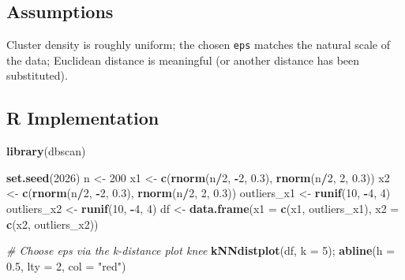 \documentclass[
]{article}
\newenvironment{Shaded}{\begin{snugshade}}{\end{snugshade}}
\newcommand{\AttributeTok}[1]{\textcolor[rgb]{0.13,0.29,0.53}{#1}}
\newcommand{\CommentTok}[1]{\textcolor[rgb]{0.56,0.35,0.01}{\textit{#1}}}
\newcommand{\DecValTok}[1]{\textcolor[rgb]{0.00,0.00,0.81}{#1}}
\newcommand{\FloatTok}[1]{\textcolor[rgb]{0.00,0.00,0.81}{#1}}
\newcommand{\FunctionTok}[1]{\textcolor[rgb]{0.13,0.29,0.53}{\textbf{#1}}}
\newcommand{\NormalTok}[1]{#1}
\newcommand{\OtherTok}[1]{\textcolor[rgb]{0.56,0.35,0.01}{#1}}
\newcommand{\SpecialCharTok}[1]{\textcolor[rgb]{0.81,0.36,0.00}{\textbf{#1}}}
\newcommand{\StringTok}[1]{\textcolor[rgb]{0.31,0.60,0.02}{#1}}
\begin{document}
\subsection{Assumptions}\label{assumptions}

Cluster density is roughly uniform; the chosen \texttt{eps} matches the
natural scale of the data; Euclidean distance is meaningful (or another
distance has been substituted).

\subsection{R Implementation}\label{r-implementation}

\begin{Shaded}
\begin{Highlighting}[]
\FunctionTok{library}\NormalTok{(dbscan)}

\FunctionTok{set.seed}\NormalTok{(}\DecValTok{2026}\NormalTok{)}
\NormalTok{n }\OtherTok{\textless{}{-}} \DecValTok{200}
\NormalTok{x1 }\OtherTok{\textless{}{-}} \FunctionTok{c}\NormalTok{(}\FunctionTok{rnorm}\NormalTok{(n}\SpecialCharTok{/}\DecValTok{2}\NormalTok{, }\SpecialCharTok{{-}}\DecValTok{2}\NormalTok{, }\FloatTok{0.3}\NormalTok{), }\FunctionTok{rnorm}\NormalTok{(n}\SpecialCharTok{/}\DecValTok{2}\NormalTok{, }\DecValTok{2}\NormalTok{, }\FloatTok{0.3}\NormalTok{))}
\NormalTok{x2 }\OtherTok{\textless{}{-}} \FunctionTok{c}\NormalTok{(}\FunctionTok{rnorm}\NormalTok{(n}\SpecialCharTok{/}\DecValTok{2}\NormalTok{, }\SpecialCharTok{{-}}\DecValTok{2}\NormalTok{, }\FloatTok{0.3}\NormalTok{), }\FunctionTok{rnorm}\NormalTok{(n}\SpecialCharTok{/}\DecValTok{2}\NormalTok{, }\DecValTok{2}\NormalTok{, }\FloatTok{0.3}\NormalTok{))}
\NormalTok{outliers\_x1 }\OtherTok{\textless{}{-}} \FunctionTok{runif}\NormalTok{(}\DecValTok{10}\NormalTok{, }\SpecialCharTok{{-}}\DecValTok{4}\NormalTok{, }\DecValTok{4}\NormalTok{)}
\NormalTok{outliers\_x2 }\OtherTok{\textless{}{-}} \FunctionTok{runif}\NormalTok{(}\DecValTok{10}\NormalTok{, }\SpecialCharTok{{-}}\DecValTok{4}\NormalTok{, }\DecValTok{4}\NormalTok{)}
\NormalTok{df }\OtherTok{\textless{}{-}} \FunctionTok{data.frame}\NormalTok{(}\AttributeTok{x1 =} \FunctionTok{c}\NormalTok{(x1, outliers\_x1),}
                 \AttributeTok{x2 =} \FunctionTok{c}\NormalTok{(x2, outliers\_x2))}

\CommentTok{\# Choose eps via the k{-}distance plot knee}
\FunctionTok{kNNdistplot}\NormalTok{(df, }\AttributeTok{k =} \DecValTok{5}\NormalTok{); }\FunctionTok{abline}\NormalTok{(}\AttributeTok{h =} \FloatTok{0.5}\NormalTok{, }\AttributeTok{lty =} \DecValTok{2}\NormalTok{, }\AttributeTok{col =} \StringTok{"red"}\NormalTok{)}


\end{Highlighting}
\end{Shaded}
\end{document}
